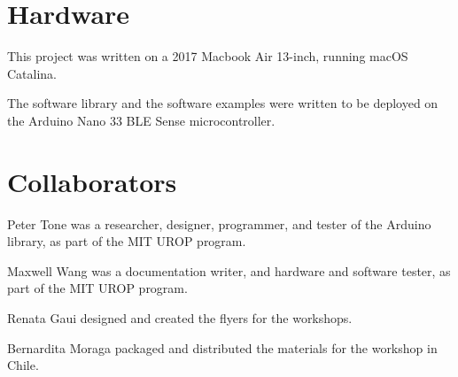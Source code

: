 \section{Hardware}

This project was written on a 2017 Macbook Air 13-inch, running macOS Catalina.

The software library and the software examples were written to be deployed on the Arduino Nano 33 BLE Sense microcontroller.

\section{Collaborators}

Peter Tone was a researcher, designer, programmer, and tester of the Arduino library, as part of the MIT UROP program.

Maxwell Wang was a documentation writer, and hardware and software tester, as part of the MIT UROP program.

Renata Gaui designed and created the flyers for the workshops.

Bernardita Moraga packaged and distributed the materials for the workshop in Chile.

\newpage

